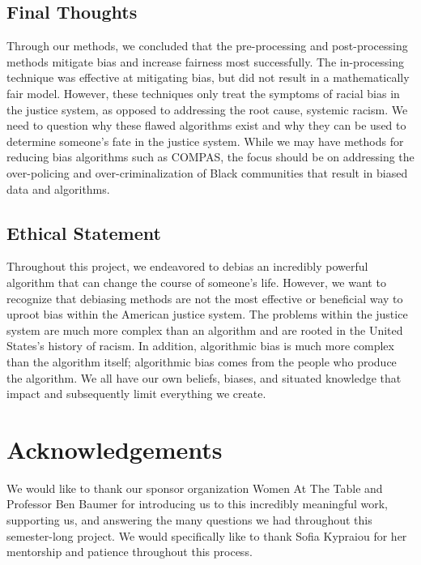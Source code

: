 \documentclass[water,article,submit,moreauthors,pdftex]{mdpi}
\begin{document}
\hypertarget{final-thoughts}{%
\subsection{Final Thoughts}\label{final-thoughts}}

Through our methods, we concluded that the pre-processing and
post-processing methods mitigate bias and increase fairness most
successfully. The in-processing technique was effective at mitigating
bias, but did not result in a mathematically fair model. However, these
techniques only treat the symptoms of racial bias in the justice system,
as opposed to addressing the root cause, systemic racism. We need to
question why these flawed algorithms exist and why they can be used to
determine someone's fate in the justice system. While we may have
methods for reducing bias algorithms such as COMPAS, the focus should be
on addressing the over-policing and over-criminalization of Black
communities that result in biased data and algorithms.

\hypertarget{ethical-statement}{%
\subsection{Ethical Statement}\label{ethical-statement}}

Throughout this project, we endeavored to debias an incredibly powerful
algorithm that can change the course of someone's life. However, we want
to recognize that debiasing methods are not the most effective or
beneficial way to uproot bias within the American justice system. The
problems within the justice system are much more complex than an
algorithm and are rooted in the United States's history of racism. In
addition, algorithmic bias is much more complex than the algorithm
itself; algorithmic bias comes from the people who produce the
algorithm. We all have our own beliefs, biases, and situated knowledge
that impact and subsequently limit everything we create.

\hypertarget{acknowledgements}{%
\section{Acknowledgements}\label{acknowledgements}}

We would like to thank our sponsor organization Women At The Table and
Professor Ben Baumer for introducing us to this incredibly meaningful
work, supporting us, and answering the many questions we had throughout
this semester-long project. We would specifically like to thank Sofia
Kypraiou for her mentorship and patience throughout this process.
\end{document}
